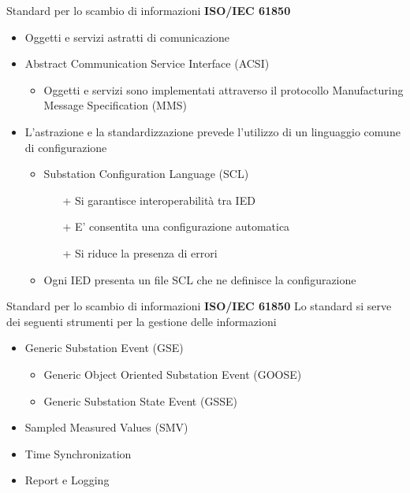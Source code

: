 \begin{frame}{Standard per lo scambio di informazioni}
\textbf{ISO/IEC 61850}
	\begin{itemize}[<+- | alert@+>]
		\item Oggetti e servizi astratti di comunicazione %
		\item Abstract Communication Service Interface (ACSI)
			\begin{itemize}[<+- | alert@+>]
				\item Oggetti e servizi sono implementati attraverso il protocollo Manufacturing Message Specification (MMS) %
			\end{itemize}
		\item L'astrazione e la standardizzazione prevede l'utilizzo di un linguaggio comune di configurazione
		\begin{itemize}[<+- | alert@+>]
			\item Substation Configuration Language (SCL)%
			\begin{itemize}[<+- | alert@+>]
			\item[+] Si garantisce interoperabilità tra IED
			\item[+] E' consentita una configurazione automatica
			\item[+] Si riduce la presenza di errori
			\end{itemize}
			\item Ogni IED presenta un file SCL che ne definisce la configurazione
		\end{itemize}
	\end{itemize}		
\end{frame}


\begin{frame}{Standard per lo scambio di informazioni}
\textbf{ISO/IEC 61850}
\newline
Lo standard si serve dei seguenti strumenti per la gestione delle informazioni
\begin{itemize}[<+- | alert@+>]
	\item Generic Substation Event (GSE)
	\begin{itemize}[<+- | alert@+>]
		\item Generic Object Oriented Substation Event (GOOSE)
		\item Generic Substation State Event (GSSE)
	\end{itemize}
	\item Sampled Measured Values (SMV)
	\item Time Synchronization
	\item Report e Logging
\end{itemize}
\end{frame}

